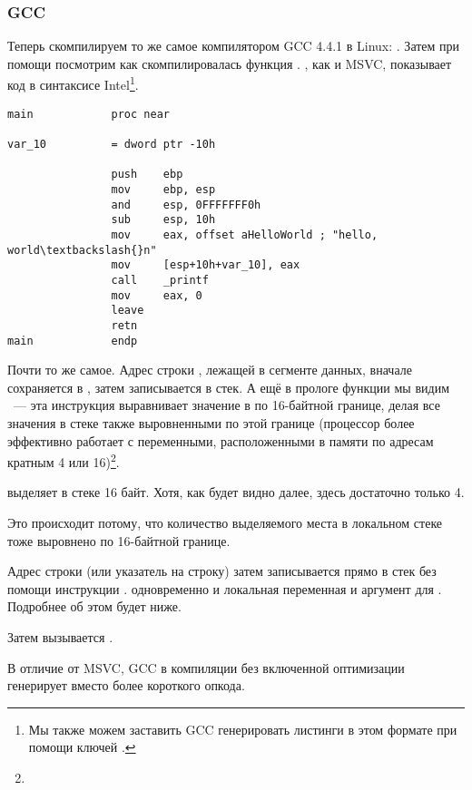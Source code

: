 \subsubsection{GCC}

Теперь скомпилируем то же самое компилятором GCC 4.4.1 в Linux: .
Затем при помощи \IDA посмотрим как скомпилировалась функция \main.
\IDA, как и MSVC, показывает код в синтаксисе Intel\footnote{Мы также можем заставить GCC генерировать листинги в этом формате при помощи ключей .}.

\begin{lstlisting}[caption=код в \IDA,style=customasmx86]
main            proc near

var_10          = dword ptr -10h

                push    ebp
                mov     ebp, esp
                and     esp, 0FFFFFFF0h
                sub     esp, 10h
                mov     eax, offset aHelloWorld ; "hello, world\textbackslash{}n"
                mov     [esp+10h+var_10], eax
                call    _printf
                mov     eax, 0
                leave
                retn
main            endp
\end{lstlisting}

Почти то же самое. 
Адрес строки , лежащей в сегменте данных, вначале сохраняется в \EAX, затем записывается в стек.
А ещё в прологе функции мы видим ~--- 
эта инструкция выравнивает значение в \ESP по 16-байтной границе, делая все значения 
в стеке также выровненными по этой границе (процессор более эффективно работает с переменными, расположенными
в памяти по адресам кратным 4 или 16)\footnote{\URLWPDA}.

 выделяет в стеке 16 байт. Хотя, как будет видно далее, здесь достаточно только 4.

Это происходит потому, что количество выделяемого места в локальном стеке тоже выровнено по 16-байтной границе.

Адрес строки (или указатель на строку) затем записывается прямо в стек без помощи инструкции \PUSH.
 одновременно и локальная переменная и аргумент для \printf{}. Подробнее об этом будет ниже.

Затем вызывается \printf.

В отличие от MSVC, GCC в компиляции без включенной оптимизации генерирует  вместо более короткого опкода.


